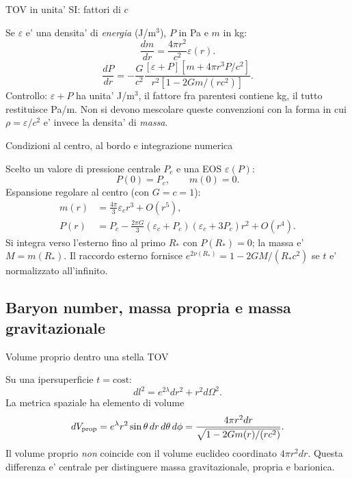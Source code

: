 \begin{frame}[t]{TOV in unita' SI: fattori di $c$}\small\raggedright
Se $\varepsilon$ e' una densita' di \emph{energia} (J/m$^3$), $P$ in Pa e $m$ in kg:
\[
\boxed{\frac{dm}{dr}=\frac{4\pi r^2}{c^2}\varepsilon(r).}
\]
\[
\boxed{
\frac{dP}{dr}=-\frac{G}{c^2}
\frac{[\varepsilon+P]
\left[m+4\pi r^3P/c^2\right]}{r^2[1-2Gm/(rc^2)]}.}
\]
Controllo: $\varepsilon+P$ ha unita' J/m$^3$, il fattore fra parentesi contiene kg, il tutto restituisce Pa/m.
\medskip
Non si devono mescolare queste convenzioni con la forma in cui $\rho=\varepsilon/c^2$ e' invece la densita' di \emph{massa}.
\end{frame}

\begin{frame}[t]{Condizioni al centro, al bordo e integrazione numerica}\small\raggedright
Scelto un valore di pressione centrale $P_c$ e una EOS $\varepsilon(P)$:
\[
P(0)=P_c,\qquad m(0)=0.
\]
Espansione regolare al centro (con $G=c=1$):
\[
\begin{aligned}
m(r)&=\frac{4\pi}{3}\varepsilon_c r^3+O(r^5),\\
P(r)&=P_c-\frac{2\pi G}{3}(\varepsilon_c+P_c)
(\varepsilon_c+3P_c)r^2+O(r^4).
\end{aligned}
\]
Si integra verso l'esterno fino al primo $R_*$ con $P(R_*)=0$; la massa e' $M=m(R_*)$.
\medskip
Il raccordo esterno fornisce
$e^{2\nu(R_*)}=1-2GM/(R_*c^2)$ se $t$ e' normalizzato all'infinito.

\end{frame}

\subsection{Baryon number, massa propria e massa gravitazionale}

\begin{frame}[t]{Volume proprio dentro una stella TOV}\small\raggedright

Su una ipersuperficie $t=\mathrm{cost}$:
\[
dl^2=e^{2\lambda}dr^2+r^2d\Omega^2.
\]
La metrica spaziale ha elemento di volume
\[
dV_{\rm prop}=e^\lambda r^2\sin\theta\,dr\,d\theta\,d\phi
=\frac{4\pi r^2dr}{\sqrt{1-2Gm(r)/(rc^2)}}.
\]
Il volume proprio \emph{non} coincide con il volume euclideo coordinato $4\pi r^2dr$.
\medskip
Questa differenza e' centrale per distinguere massa gravitazionale, propria e barionica.

\end{frame}

